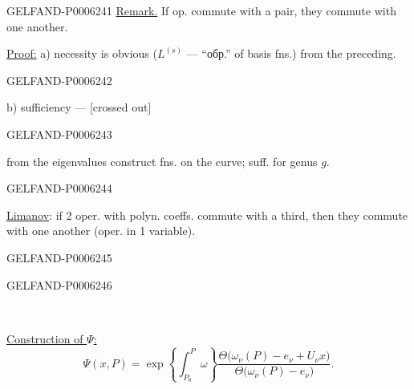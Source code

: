 \begin{GelfandAdjacentEvidence}{GELFAND-P000624}{1}
\underline{Remark.} If op. commute with a pair, they commute with one another.

\underline{Proof:} a) necessity is obvious (\(L^{(s)}\) --- “обр.” of basis fns.) from the preceding.
\end{GelfandAdjacentEvidence}
\begin{GelfandAdjacentEvidence}{GELFAND-P000624}{2}


b) sufficiency --- [crossed out]
\end{GelfandAdjacentEvidence}
\begin{GelfandAdjacentEvidence}{GELFAND-P000624}{3}

from the eigenvalues construct fns. on the curve; suff. for genus \(g\).
\end{GelfandAdjacentEvidence}
\begin{GelfandAdjacentEvidence}{GELFAND-P000624}{4}


\underline{Limanov}: if 2 oper. with polyn. coeffs. commute with a third, then they commute with one another (oper. in 1 variable).
\end{GelfandAdjacentEvidence}
\begin{GelfandAdjacentEvidence}{GELFAND-P000624}{5}

\end{GelfandAdjacentEvidence}
\begin{GelfandAdjacentEvidence}{GELFAND-P000624}{6}


\begin{center}\textemdash\,\textperiodcentered\,\textemdash\end{center}
\underline{Construction of \(\Psi\):}
\[
\Psi(x,P)=\exp\left\{\int_{P_0}^{P}\omega\right\}
\frac{\Theta\bigl(\omega_\nu(P)-e_\nu+U_\nu x\bigr)}
{\Theta\bigl(\omega_\nu(P)-e_\nu\bigr)}.
\]
\end{GelfandAdjacentEvidence}
